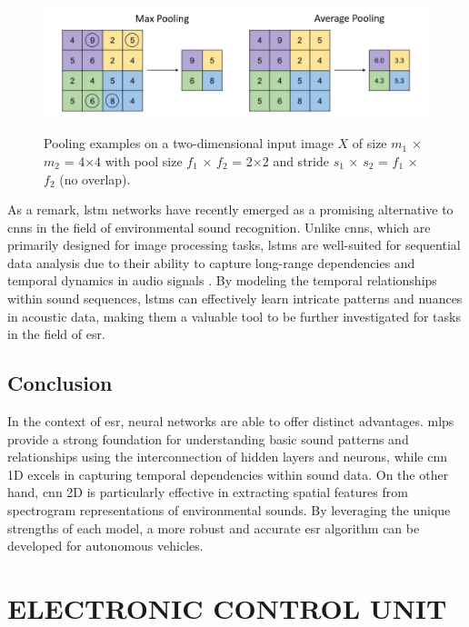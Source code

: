 \begin{figure}[htbp]
    \raggedright
        \caption{Pooling examples on a two-dimensional input image $X$ of size $m_1$ × $m_2$ = 4×4 with pool size $f_1$ × $f_2$ = 2×2 and stride $s_1$ × $s_2$ = $f_1$ × $f_2$ (no overlap).}
        \includegraphics[width=.9\textwidth]{resources/images/030-theoretical_framework/Framework_cnn_pooling.png}
        \label{fig:frmwk_cnn_pooling}
\end{figure}

As a remark, \gls{lstm} networks have recently emerged as a promising alternative to \gls{cnn}s in the field of environmental sound recognition. Unlike \gls{cnn}s, which are primarily designed for image processing tasks, \gls{lstm}s are well-suited for sequential data analysis due to their ability to capture long-range dependencies and temporal dynamics in audio signals \cite{Bubashait2021}. By modeling the temporal relationships within sound sequences, \gls{lstm}s can effectively learn intricate patterns and nuances in acoustic data, making them a valuable tool to be further investigated for tasks in the field of \gls{esr}.


\subsection{Conclusion}
\label{sec:frmwk_neural_networks_conclusion}

In the context of \gls{esr}, neural networks are able to offer distinct advantages. \gls{mlp}s provide a strong foundation for understanding basic sound patterns and relationships using the interconnection of hidden layers and neurons, while \gls{cnn} 1D excels in capturing temporal dependencies within sound data. On the other hand, \gls{cnn} 2D is particularly effective in extracting spatial features from spectrogram representations of environmental sounds. By leveraging the unique strengths of each model, a more robust and accurate \gls{esr} algorithm can be developed for autonomous vehicles.


\section{ELECTRONIC CONTROL UNIT}
\label{sec:frmwk_electronic_control_unit}

